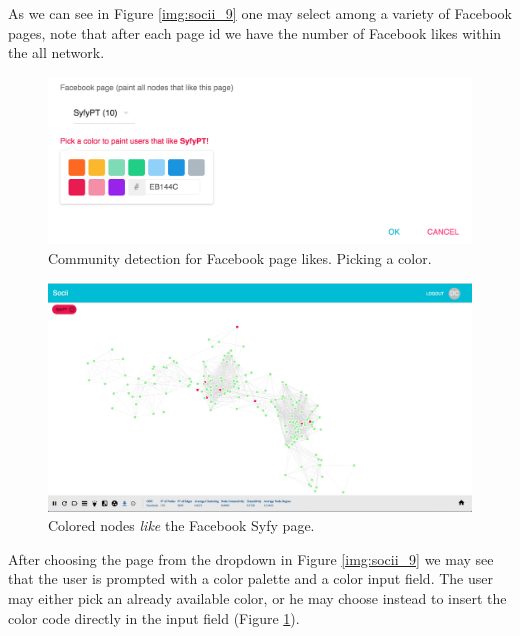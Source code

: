 As we can see in Figure \ref{img:socii_9} one may select among a variety of Facebook pages, note that after each page id we have the number of Facebook likes within the all network.

\begin{figure}[h!]
\begin{center}
  \hspace*{-0.8in}
  \includegraphics[width=1.2\textwidth]{img/socii/socii_10_v2.png}
\end{center}
\caption{\label{img:socii_10} Community detection for Facebook page likes. Picking a color.}
\end{figure}

\begin{figure}[h!]
\begin{center}
  \hspace*{-0.8in}
  \includegraphics[width=1.2\textwidth]{img/socii/socii_11.png}
\end{center}
\caption{\label{img:socii_11} Colored nodes \textit{like} the Facebook Syfy page.}
\end{figure}

\indent After choosing the page from the dropdown in Figure \ref{img:socii_9} we may see that the user is prompted with a color palette and a color input field. The user may either pick an already available color, or he may choose instead to insert the color code directly in the input field (Figure \ref{img:socii_10}).

